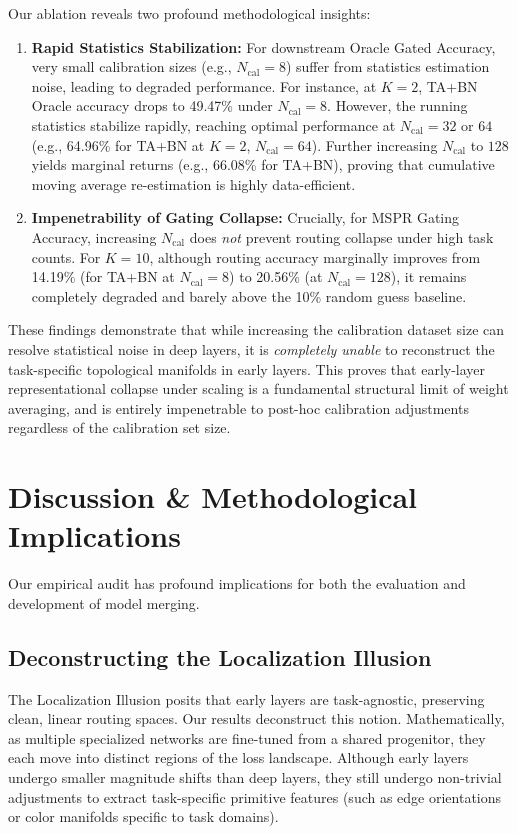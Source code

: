 \documentclass{article}
\theoremstyle{plain}
\theoremstyle{definition}
\theoremstyle{remark}
\begin{document}
Our ablation reveals two profound methodological insights:
\begin{enumerate}
    \item \textbf{Rapid Statistics Stabilization:} For downstream Oracle Gated Accuracy, very small calibration sizes (e.g., $N_{\text{cal}} = 8$) suffer from statistics estimation noise, leading to degraded performance. For instance, at $K=2$, TA+BN Oracle accuracy drops to 49.47\% under $N_{\text{cal}} = 8$. However, the running statistics stabilize rapidly, reaching optimal performance at $N_{\text{cal}} = 32$ or $64$ (e.g., 64.96\% for TA+BN at $K=2$, $N_{\text{cal}}=64$). Further increasing $N_{\text{cal}}$ to $128$ yields marginal returns (e.g., 66.08\% for TA+BN), proving that cumulative moving average re-estimation is highly data-efficient.
    \item \textbf{Impenetrability of Gating Collapse:} Crucially, for MSPR Gating Accuracy, increasing $N_{\text{cal}}$ does \emph{not} prevent routing collapse under high task counts. For $K=10$, although routing accuracy marginally improves from 14.19\% (for TA+BN at $N_{\text{cal}}=8$) to 20.56\% (at $N_{\text{cal}}=128$), it remains completely degraded and barely above the 10\% random guess baseline.
\end{enumerate}

These findings demonstrate that while increasing the calibration dataset size can resolve statistical noise in deep layers, it is \emph{completely unable} to reconstruct the task-specific topological manifolds in early layers. This proves that early-layer representational collapse under scaling is a fundamental structural limit of weight averaging, and is entirely impenetrable to post-hoc calibration adjustments regardless of the calibration set size.

\section{Discussion \& Methodological Implications}
Our empirical audit has profound implications for both the evaluation and development of model merging.

\subsection{Deconstructing the Localization Illusion}
The Localization Illusion posits that early layers are task-agnostic, preserving clean, linear routing spaces. Our results deconstruct this notion. Mathematically, as multiple specialized networks are fine-tuned from a shared progenitor, they each move into distinct regions of the loss landscape. Although early layers undergo smaller magnitude shifts than deep layers, they still undergo non-trivial adjustments to extract task-specific primitive features (such as edge orientations or color manifolds specific to task domains).
\end{document}
